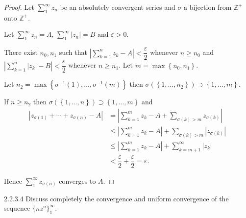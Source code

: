 \begin{proof}
	Let \( \sum_{1}^{\infty} z_{n} \) be an absolutely convergent series and \( \sigma \) a bijection from \( \mathbb{Z}^{+} \) onto \( \mathbb{Z}^{+} \).

	Let \( \sum_{1}^{\infty} z_{n} = A \), \( \sum_{1}^{\infty} \left\vert z_{n} \right\vert = B \) and \( \varepsilon > 0 \).

	There exist \( n_{0}, n_{1} \) such that \( \left\vert \sum_{k=1}^{n} z_{k} - A \right\vert < \dfrac{\varepsilon}{2} \) whenever \( n \ge n_{0} \) and \( \left\vert \sum_{k=1}^{n} \left\vert z_{k} \right\vert - B \right\vert < \dfrac{\varepsilon}{2} \) whenever \( n \ge n_{1} \). Let \( m = \max\left\{ n_{0}, n_{1} \right\} \).

	Let \( n_{2} = \max\left\{ \sigma^{-1}(1), \ldots, \sigma^{-1}(m) \right\} \) then \( \sigma(\left\{ 1, \ldots, n_{2} \right\}) \supset \left\{ 1, \ldots, m \right\} \).

	If \( n \ge n_{2} \) then \( \sigma(\left\{ 1, \ldots, n \right\}) \supset \left\{ 1, \ldots, m \right\} \) and
	\begingroup
	\allowdisplaybreaks%
	\begin{align*}
		\left\vert z_{\sigma(1)} + \cdots + z_{\sigma(n)} - A \right\vert & = \left\vert \sum_{k=1}^{m} z_{k} - A + \sum_{\sigma(k) > m} z_{\sigma(k)} \right\vert                           \\
		                                                                  & \le \left\vert  \sum_{k=1}^{m} z_{k} - A \right\vert + \sum_{\sigma(k) > m} \left\vert z_{\sigma(k)} \right\vert \\
		                                                                  & \le \left\vert  \sum_{k=1}^{m} z_{k} - A \right\vert + \sum_{k=m+1}^{\infty} \left\vert z_{k} \right\vert        \\
		                                                                  & < \dfrac{\varepsilon}{2} + \dfrac{\varepsilon}{2} = \varepsilon.
	\end{align*}
	\endgroup

	Hence \( \sum_{1}^{\infty} z_{\sigma(n)} \) converges to \( A \).
\end{proof}

\begin{problem}{2.2.3.4}
Discuss completely the convergence and uniform convergence of the sequence \( {\{ nz^{n} \}}_{1}^{\infty} \).
\end{problem}

